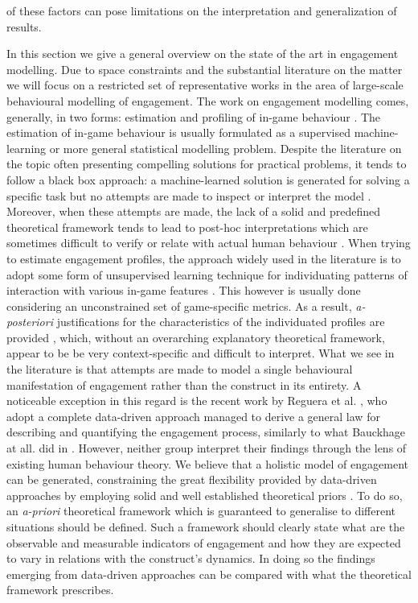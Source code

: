 of these factors can pose limitations on the interpretation and generalization of results. 


In this section we give a general overview on the state of the art in engagement modelling. Due to space constraints and the substantial literature on the matter we will focus on a restricted set of representative works in the area of large-scale behavioural modelling of engagement. The work on engagement modelling comes, generally, in two forms: estimation and profiling of in-game behaviour \cite{el2016game}. The estimation of in-game behaviour is usually formulated as a supervised machine-learning or more general statistical modelling problem\cite{el2016game}. Despite the literature on the topic often presenting compelling solutions for practical problems, it tends to follow a black box approach: a machine-learned solution is generated for solving a specific task but no attempts are made to inspect or interpret the model \cite{lee2018game, liu2019micro, del2020time, kristensen2019combining}. Moreover, when these attempts are made, the lack of a solid and predefined theoretical framework tends to lead to post-hoc interpretations which are sometimes difficult to verify or relate with actual human behaviour \cite{drachen2016rapid, del2019profiling}. When trying to estimate engagement profiles, the approach widely used in the literature is to adopt some form of unsupervised learning technique for individuating patterns of interaction with various in-game features \cite{el2016game, del2019profiling}. This however is usually done considering an unconstrained set of game-specific metrics. As a result, \textit{a-posteriori} justifications for the characteristics of the individuated profiles are provided \cite{drachen2012guns, makarovych2018like, drachen2009player}, which, without an overarching explanatory theoretical framework, appear to be be very context-specific and difficult to interpret. What we see in the literature is that attempts are made to model a single behavioural manifestation of engagement rather than the construct in its entirety. A noticeable exception in this regard is the recent work by Reguera et al. \cite{reguera2020quantifying}, who adopt a complete data-driven approach managed to derive a general law for describing and quantifying the engagement process, similarly to what Bauckhage at all. did in \cite{bauckhage2012players}. However, neither group interpret their findings through the lens of existing human behaviour theory. We believe that a holistic model of engagement can be generated, constraining the great flexibility provided by data-driven approaches by employing solid and well established theoretical priors \cite{yannakakis2013player}. To do so, an \textit{a-priori} theoretical framework which is guaranteed to generalise to different situations should be defined. Such a framework should clearly state what are the observable and measurable indicators of engagement and how they are expected to vary in relations with the construct's dynamics. In doing so the findings emerging from data-driven approaches can be compared with what the theoretical framework prescribes.
